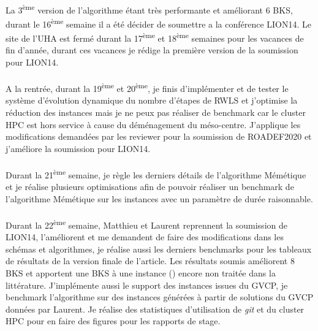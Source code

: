 \documentclass[a4paper,11pt,twoside,french,report]{../common/simplem}
\begin{document}
				\paragraph*{}
					La 3\textsuperscript{ème} version de l'algorithme étant très performante et améliorant 6 \gls{BKS}, durant le 16\textsuperscript{ème} semaine il a été décider de soumettre a la conférence \acrshort{LION14}. Le site de l'\gls{UHA} est fermé durant la 17\textsuperscript{ème} et 18\textsuperscript{ème} semaines pour les vacances de fin d'année, durant ces vacances je rédige la première version de la soumission pour \acrshort{LION14}.
				\paragraph*{}
					A la rentrée, durant la 19\textsuperscript{ème} et 20\textsuperscript{ème}, je finis d'implémenter et de tester le système d'évolution dynamique du nombre d'étapes de \gls{RWLS} et j'optimise la réduction des instances mais je ne peux pas réaliser de benchmark car le cluster \gls{HPC} est hors service à cause du déménagement du méso-centre. J'applique les modifications demandées par les reviewer pour la soumission de \acrshort{ROADEF2020} et j'améliore la soumission pour \acrshort{LION14}.
				\paragraph*{}
					Durant la 21\textsuperscript{ème} semaine, je règle les derniers détails de l'algorithme Mémétique et je réalise plusieurs optimisations afin de pouvoir réaliser un benchmark de l'algorithme Mémétique sur les instances  avec un paramètre de durée raisonnable.
				\paragraph*{}
					Durant la 22\textsuperscript{ème} semaine, Matthieu et Laurent reprennent la soumission de \acrshort{LION14}, l'améliorent et me demandent de faire des modifications dans les schémas et algorithmes, je réalise aussi les derniers benchmarks pour les tableaux de résultats de la version finale de l'article. Les résultats soumis améliorent 8 \gls{BKS} et apportent une \gls{BKS} à une instance () encore non traitée dans la littérature. J'implémente aussi le support des instances issues du \gls{GVCP}, je benchmark l'algorithme sur des instances générées à partir de solutions du \gls{GVCP} données par Laurent. Je réalise des statistiques d'utilisation de \textit{git} et du cluster \gls{HPC} pour en faire des figures pour les rapports de stage.
\end{document}
